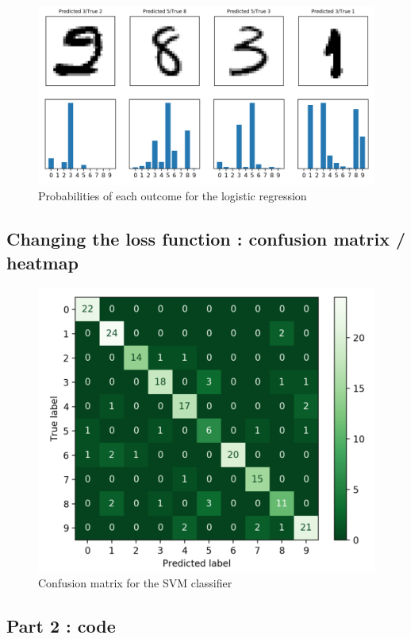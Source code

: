 \begin{figure}[h]
	\centering 
	\includegraphics[scale=0.35]{Pics/probas}
	\caption{Probabilities of each outcome for the logistic regression}
	\label{fig:probas}
\end{figure}



\newpage

\subsection{Changing the loss function : confusion matrix / heatmap}
\label{appendix:changingloss}
\begin{figure}[h]
	\centering 
	\includegraphics[scale=0.4]{Pics/confusion_matrixr}
	\caption{Confusion matrix for the SVM classifier}
	\label{fig:confusion}
\end{figure}


\subsection{Part 2 : code}